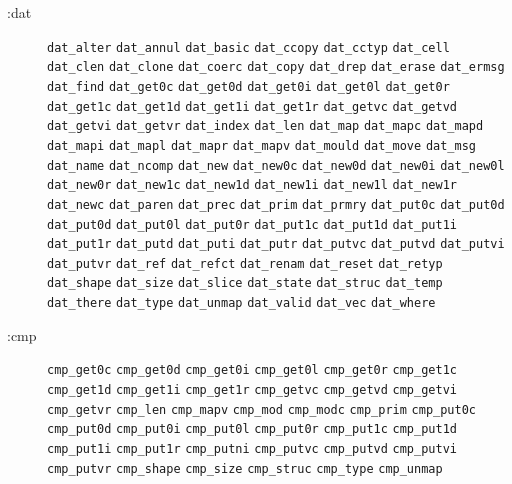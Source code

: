 \documentclass[twoside,11pt]{article}
\begin{document}
\begin{description}
\item[:dat]%
\mbox{}
\begin{flushleft}
\texttt{dat\_alter} \texttt{dat\_annul} \texttt{dat\_basic}
\texttt{dat\_ccopy} \texttt{dat\_cctyp} \texttt{dat\_cell}
\texttt{dat\_clen} \texttt{dat\_clone} \texttt{dat\_coerc}
\texttt{dat\_copy} \texttt{dat\_drep} \texttt{dat\_erase}
\texttt{dat\_ermsg} \texttt{dat\_find} \texttt{dat\_get0c}
\texttt{dat\_get0d} \texttt{dat\_get0i} \texttt{dat\_get0l}
\texttt{dat\_get0r} \texttt{dat\_get1c} \texttt{dat\_get1d}
\texttt{dat\_get1i} \texttt{dat\_get1r} \texttt{dat\_getvc}
\texttt{dat\_getvd} \texttt{dat\_getvi} \texttt{dat\_getvr}
\texttt{dat\_index} \texttt{dat\_len} \texttt{dat\_map}
\texttt{dat\_mapc} \texttt{dat\_mapd} \texttt{dat\_mapi}
\texttt{dat\_mapl} \texttt{dat\_mapr} \texttt{dat\_mapv}
\texttt{dat\_mould} \texttt{dat\_move} \texttt{dat\_msg}
\texttt{dat\_name} \texttt{dat\_ncomp} \texttt{dat\_new}
\texttt{dat\_new0c} \texttt{dat\_new0d} \texttt{dat\_new0i}
\texttt{dat\_new0l} \texttt{dat\_new0r} \texttt{dat\_new1c}
\texttt{dat\_new1d} \texttt{dat\_new1i} \texttt{dat\_new1l}
\texttt{dat\_new1r} \texttt{dat\_newc} \texttt{dat\_paren}
\texttt{dat\_prec} \texttt{dat\_prim} \texttt{dat\_prmry}
\texttt{dat\_put0c} \texttt{dat\_put0d} \texttt{dat\_put0d}
\texttt{dat\_put0l} \texttt{dat\_put0r} \texttt{dat\_put1c}
\texttt{dat\_put1d} \texttt{dat\_put1i} \texttt{dat\_put1r}
\texttt{dat\_putd} \texttt{dat\_puti} \texttt{dat\_putr}
\texttt{dat\_putvc} \texttt{dat\_putvd} \texttt{dat\_putvi}
\texttt{dat\_putvr} \texttt{dat\_ref} \texttt{dat\_refct}
\texttt{dat\_renam} \texttt{dat\_reset} \texttt{dat\_retyp}
\texttt{dat\_shape} \texttt{dat\_size} \texttt{dat\_slice}
\texttt{dat\_state} \texttt{dat\_struc} \texttt{dat\_temp}
\texttt{dat\_there} \texttt{dat\_type} \texttt{dat\_unmap}
\texttt{dat\_valid} \texttt{dat\_vec} \texttt{dat\_where}
\end{flushleft}

\item[:cmp]%
\mbox{}
\begin{flushleft}
\texttt{cmp\_get0c} \texttt{cmp\_get0d} \texttt{cmp\_get0i}
\texttt{cmp\_get0l} \texttt{cmp\_get0r} \texttt{cmp\_get1c}
\texttt{cmp\_get1d}  \texttt{cmp\_get1i} \texttt{cmp\_get1r}
\texttt{cmp\_getvc} \texttt{cmp\_getvd} \texttt{cmp\_getvi}
\texttt{cmp\_getvr} \texttt{cmp\_len} \texttt{cmp\_mapv}
\texttt{cmp\_mod}  \texttt{cmp\_modc} \texttt{cmp\_prim}
\texttt{cmp\_put0c} \texttt{cmp\_put0d} \texttt{cmp\_put0i}
\texttt{cmp\_put0l} \texttt{cmp\_put0r} \texttt{cmp\_put1c}
\texttt{cmp\_put1d} \texttt{cmp\_put1i} \texttt{cmp\_put1r}
\texttt{cmp\_putni} \texttt{cmp\_putvc} \texttt{cmp\_putvd}
\texttt{cmp\_putvi} \texttt{cmp\_putvr} \texttt{cmp\_shape}
\texttt{cmp\_size} \texttt{cmp\_struc} \texttt{cmp\_type}
\texttt{cmp\_unmap}
\end{flushleft}


\end{description}
\end{document}
